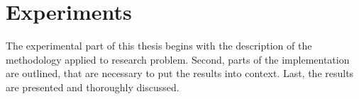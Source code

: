 \chapter{Experiments} %
\label{cha:experiments}

The experimental part of this thesis begins with the description of the methodology applied to research problem. Second, parts of the implementation are outlined, that are necessary to put the results into context. Last, the results are presented and thoroughly discussed.